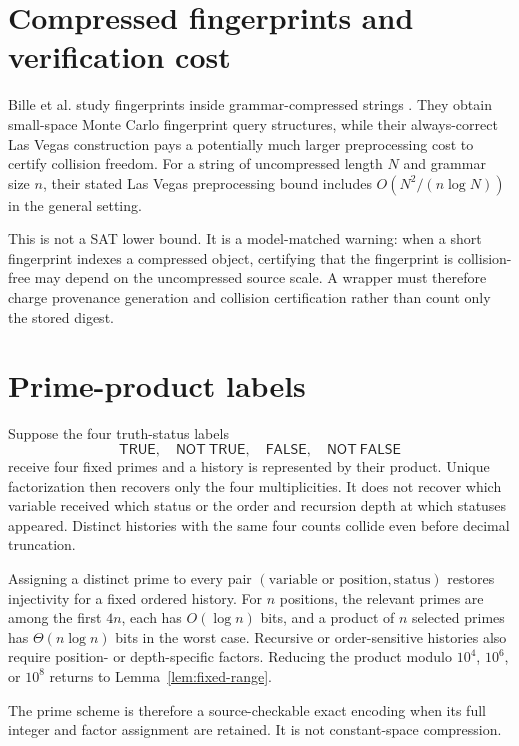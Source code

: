 \documentclass[11pt]{article}
\begin{document}
\section{Compressed fingerprints and verification cost}

Bille et al. study fingerprints inside grammar-compressed strings
\cite{bille2017}.  They obtain small-space Monte Carlo fingerprint query
structures, while their always-correct Las Vegas construction pays a
potentially much larger preprocessing cost to certify collision freedom.
For a string of uncompressed length $N$ and grammar size $n$, their stated
Las Vegas preprocessing bound includes
$O(N^2/(n\log N))$ in the general setting.

This is not a SAT lower bound.  It is a model-matched warning: when a short
fingerprint indexes a compressed object, certifying that the fingerprint is
collision-free may depend on the uncompressed source scale.  A wrapper must
therefore charge provenance generation and collision certification rather
than count only the stored digest.

\section{Prime-product labels}

Suppose the four truth-status labels
\[
 \mathsf{TRUE},\quad\mathsf{NOT\ TRUE},\quad
 \mathsf{FALSE},\quad\mathsf{NOT\ FALSE}
\]
receive four fixed primes and a history is represented by their product.
Unique factorization then recovers only the four multiplicities.  It does not
recover which variable received which status or the order and recursion
depth at which statuses appeared.  Distinct histories with the same four
counts collide even before decimal truncation.

Assigning a distinct prime to every pair
$(\text{variable or position},\text{status})$ restores injectivity for a
fixed ordered history.  For $n$ positions, the relevant primes are among the
first $4n$, each has $O(\log n)$ bits, and a product of $n$ selected primes
has $\Theta(n\log n)$ bits in the worst case.  Recursive or order-sensitive
histories also require position- or depth-specific factors.  Reducing the
product modulo $10^4$, $10^6$, or $10^8$ returns to
Lemma~\ref{lem:fixed-range}.

The prime scheme is therefore a source-checkable exact encoding when its full
integer and factor assignment are retained.  It is not constant-space
compression.
\end{document}
